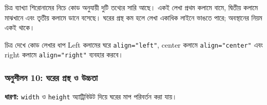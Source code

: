 \par\noindent
\begin{minipage}[t]{.48\linewidth}\vspace{0pt}
\begin{keypointbox}{চিত্র ব্যাখ্যা}
শিরোনামের নিচে কোড অনুযায়ী দুটি তথ্যের সারি আছে। একই লেখা প্রথম কলামে বামে, দ্বিতীয় কলামে মাঝখানে এবং তৃতীয় কলামে ডানে বসেছে। ঘরের প্রস্থ কম হলে লেখা একাধিক লাইনে ভাঙতে পারে; অবস্থানের নিয়ম একই থাকে।
\end{keypointbox}
\end{minipage}\hfill
\begin{minipage}[t]{.48\linewidth}\vspace{0pt}
\begin{keypointbox}{চিত্র দেখে কোড লেখার ধাপ}
Left কলামের ঘরে \texttt{align="left"}, center কলামে \texttt{align="center"} এবং right কলামে \texttt{align="right"} ব্যবহার করবে।
\end{keypointbox}
\end{minipage}\par\smallskip




\subsubsection{অনুশীলন 10: ঘরের প্রস্থ ও উচ্চতা}\par\smallskip\textbf{ধারণা:}
\texttt{width} ও \texttt{height} অ্যাট্রিবিউট দিয়ে ঘরের মাপ পরিবর্তন করা যায়।


